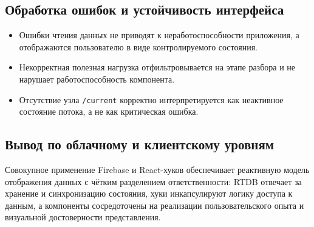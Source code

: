 \subsection{Обработка ошибок и устойчивость интерфейса}

\begin{itemize}
    \item Ошибки чтения данных не приводят к неработоспособности приложения, а отображаются пользователю в виде контролируемого состояния.
    \item Некорректная полезная нагрузка отфильтровывается на этапе разбора и не нарушает работоспособность компонента.
    \item Отсутствие узла \texttt{/current} корректно интерпретируется как неактивное состояние потока, а не как критическая ошибка.
\end{itemize}

\subsection{Вывод по облачному и клиентскому уровням}

Совокупное применение Firebase и React-хуков обеспечивает реактивную модель отображения данных с чётким разделением ответственности: RTDB отвечает за хранение и синхронизацию состояния, хуки инкапсулируют логику доступа к данным, а компоненты сосредоточены на реализации пользовательского опыта и визуальной достоверности представления.
